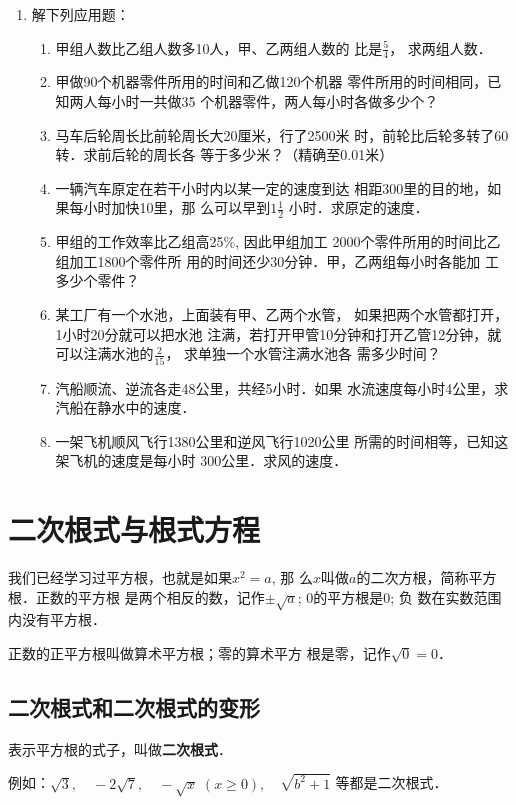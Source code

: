 \begin{enumerate}
\item 解下列应用题：
\begin{enumerate}
\item 甲组人数比乙组人数多10人，甲、乙两组人数的
比是$\frac{5}{4}$，
求两组人数．
\item 甲做90个机器零件所用的时间和乙做120个机器
零件所用的时间相同，已知两人每小时一共做35
个机器零件，两人每小时各做多少个？
\item 马车后轮周长比前轮周长大20厘米，行了2500米
时，前轮比后轮多转了60转．求前后轮的周长各
等于多少米？（精确至0.01米）
\item 一辆汽车原定在若干小时内以某一定的速度到达
相距300里的目的地，如果每小时加快10里，那
么可以早到$1\frac{1}{2}$
小时．求原定的速度．
\item 甲组的工作效率比乙组高25\%, 因此甲组加工
2000个零件所用的时间比乙组加工1800个零件所
用的时间还少30分钟．甲，乙两组每小时各能加
工多少个零件？
\item 某工厂有一个水池，上面装有甲、乙两个水管，
如果把两个水管都打开，1小时20分就可以把水池
注满，若打开甲管10分钟和打开乙管12分钟，就
可以注满水池的$\frac{2}{15}$，
求单独一个水管注满水池各
需多少时间？
\item 汽船顺流、逆流各走48公里，共经5小时．如果
水流速度每小时4公里，求汽船在静水中的速度．
\item 一架飞机顺风飞行1380公里和逆风飞行1020公里
所需的时间相等，已知这架飞机的速度是每小时
300公里．求风的速度．
\end{enumerate}
\end{enumerate}

\section{二次根式与根式方程}
我们已经学习过平方根，也就是如果$x^2=a$, 那
么$x$叫做$a$的二次方根，简称平方根．正数的平方根
是两个相反的数，记作$\pm\sqrt{a}$; 0的平方根是0; 负
数在实数范围内没有平方根．

正数的正平方根叫做算术平方根；零的算术平方
根是零，记作$\sqrt{0}=0$．

\subsection{二次根式和二次根式的变形}
表示平方根的式子，叫做\textbf{二次根式}．

例如：$\sqrt{3},\quad -2\sqrt{7},\quad -\sqrt{x}\; (x\ge 0),\quad \sqrt{b^2+1}$
等都是二次根式．

